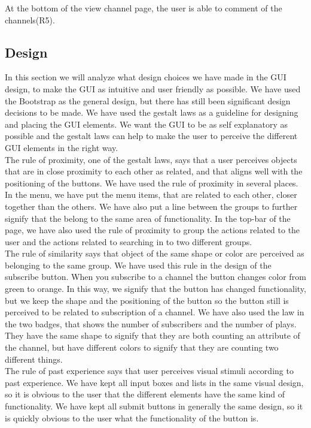 \documentclass[a4paper,11pt,report]{article}
\begin{document}
At the bottom of the view channel page, the user is able to comment of the channels(R5). \\

\subsection{Design}
In this section we will analyze what design choices we have made in the GUI design, to make the GUI as intuitive and user friendly as possible. We have used the Bootstrap as the general design, but there has still been significant design decisions to be made. We have used the gestalt laws\cite{gestalt} as a guideline for designing and placing the GUI elements. We want the GUI to be as self explanatory as possible and the gestalt laws can help to make the user to perceive the different GUI elements in the right way. \\

The rule of proximity, one of the gestalt laws, says that a user perceives objects that are in close proximity to each other as related, and that aligns well with the positioning of the buttons. We have used the rule of proximity in several places. In the menu, we have put the menu items, that are related to each other, closer together than the others. We have also put a line between the groups to further signify that the belong to the same area of functionality. In the top-bar of the page, we have also used the rule of proximity to group the actions related to the user and the actions related to searching in to two different groups. \\

The rule of similarity says that object of the same shape or color are perceived as belonging to the same group. We have used this rule in the design of the subscribe button. When you subscribe to a channel the button changes color from green to orange. In this way, we signify that the button has changed functionality, but we keep the shape and the positioning of the button so the button still is perceived to be related to subscription of a channel. We have also used the law in the two badges, that shows the number of subscribers and the number of plays. They have the same shape to signify that they are both counting an attribute of the channel, but have different colors to signify that they are counting two different things. \\

The rule of past experience says that user perceives visual stimuli according to past experience. We have kept all input boxes and lists in the same visual design, so it is obvious to the user that the different elements have the same kind of functionality. We have kept all submit buttons in generally the same design, so it is quickly obvious to the user what the functionality of the button is. \\ 
\end{document}
